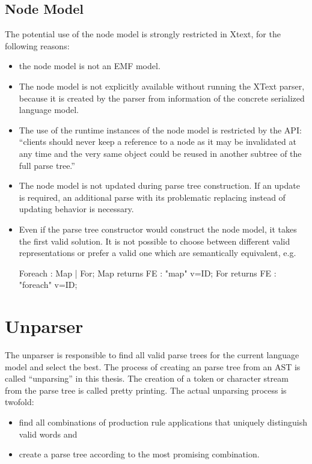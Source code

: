 \subsection{Node Model}
The potential use of the node model is strongly restricted in Xtext, for the following reasons:
\begin{itemize}
	\item the node model is not an EMF model. 
	\item The node model is not explicitly available without running the XText parser, because it is created by the parser from information of the concrete serialized language model. 
	\item The use of the runtime instances of the node model is restricted by the API: ``clients should never keep a reference to a node as it may be invalidated at any time and the very same object could be reused in another subtree of the full parse tree.''\cite{XTextAPI}
	\item The node model is not updated during parse tree construction. If an update is required, an additional parse with its problematic replacing instead of updating behavior is necessary.
	\item Even if the parse tree constructor would construct the node model, it takes the first valid solution. It is not possible to choose between different valid representations or prefer a valid one which are semantically equivalent, e.g.
\begin{xtxt}
Foreach 		: 	Map | For;
Map returns FE  	:  	"map" 		v=ID;
For returns FE  	: 	"foreach"	v=ID;
\end{xtxt}
\end{itemize}











\section{Unparser}
The unparser is responsible to find all valid parse trees for the current language model and select the best. The process of creating an parse tree from an AST is called ``unparsing'' in this thesis. The creation of a token or character stream from the parse tree is called pretty printing. The actual unparsing process is twofold:
\begin{itemize}
	\item find all combinations of production rule applications that uniquely distinguish valid words and
	\item create a parse tree according to the most promising combination. 
\end{itemize}
 

